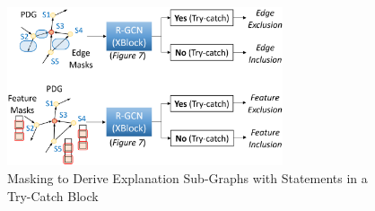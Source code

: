 
\begin{figure}[t]
	\centering
	\includegraphics[width=3.2in]{XAI.png}
        \vspace{-0.06in}
	\caption{Masking to Derive Explanation Sub-Graphs with Statements in a Try-Catch Block}
        \vspace{-0.06in}
	\label{fig:GNNEX}	
\end{figure}




